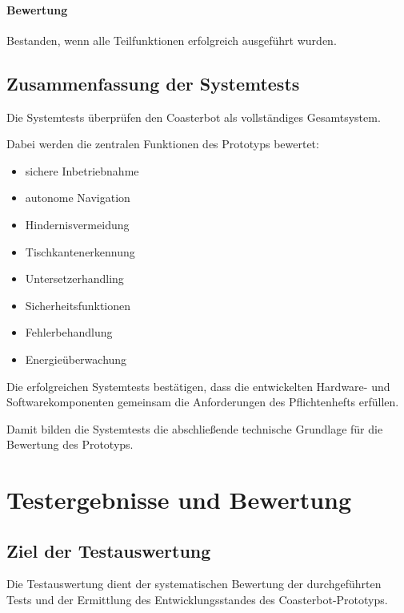 \documentclass[
  a4paper,
  12pt,
  DIV=12,        %
  parskip=half,  %
  headings=small %
]{scrartcl}
\theoremstyle{definition}
\providecommand{\tightlist}{%
  \setlength{\itemsep}{0pt}\setlength{\parskip}{0pt}}
\theoremstyle{definition}
\begin{document}
\paragraph{Bewertung}\label{bewertung-33}

Bestanden, wenn alle Teilfunktionen erfolgreich ausgeführt wurden.

\subsection{Zusammenfassung der
Systemtests}\label{zusammenfassung-der-systemtests}

Die Systemtests überprüfen den Coasterbot als vollständiges
Gesamtsystem.

Dabei werden die zentralen Funktionen des Prototyps bewertet:

\begin{itemize}
\tightlist
\item
  sichere Inbetriebnahme
\item
  autonome Navigation
\item
  Hindernisvermeidung
\item
  Tischkantenerkennung
\item
  Untersetzerhandling
\item
  Sicherheitsfunktionen
\item
  Fehlerbehandlung
\item
  Energieüberwachung
\end{itemize}

Die erfolgreichen Systemtests bestätigen, dass die entwickelten
Hardware- und Softwarekomponenten gemeinsam die Anforderungen des
Pflichtenhefts erfüllen.

Damit bilden die Systemtests die abschließende technische Grundlage für
die Bewertung des Prototyps.

\section{Testergebnisse und
Bewertung}\label{testergebnisse-und-bewertung}

\subsection{Ziel der Testauswertung}\label{ziel-der-testauswertung}

Die Testauswertung dient der systematischen Bewertung der durchgeführten
Tests und der Ermittlung des Entwicklungsstandes des
Coasterbot-Prototyps.
\end{document}
